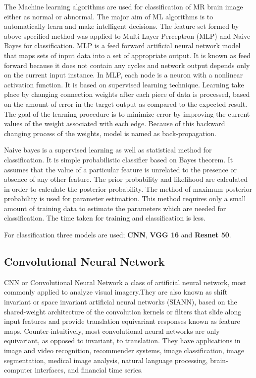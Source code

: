 \documentclass[11pt]{article}
\begin{document}
	The Machine learning algorithms are used for
	classification of MR brain image either as normal or abnormal.  The major
	aim of ML algorithms is to automatically learn and make intelligent
	decisions. The feature set formed by above specified method was applied to
	Multi-Layer Perceptron (MLP) and Naive Bayes for classification.  MLP is
	a feed forward artificial neural network model that maps sets of input data
	into a set of appropriate output. It is known as feed forward because it
	does not contain any cycles and network output depends only on the current
	input instance. In MLP, each node is a neuron with a nonlinear activation
	function. It is based on supervised learning technique. Learning take place
	by changing connection weights after each piece of data is processed, based
	on the amount of error in the target output as compared to the expected
	result. The goal of the learning procedure is to minimize error by improving
	the current values of the weight associated with each edge. Because of this
	backward changing process of the weights, model is named as
	back-propagation.

	Naive bayes is a supervised learning as well as statistical method for
	classification. It is simple probabilistic classifier based on Bayes
	theorem. It assumes that the value of a particular feature is unrelated to
	the presence or absence of any other feature. The prior probability and
	likelihood are calculated in order to calculate the posterior probability.
	The method of maximum posterior probability is used for parameter
	estimation. This method requires only a small amount of training data to
	estimate the parameters which are needed for classification. The time taken
	for training and classification is less.

	For classification three models are used; \textbf{CNN}, \textbf{VGG 16} and
	\textbf{Resnet 50}.

	\subsection{Convolutional Neural Network}%
	\label{sub:Convolutional Neural Network}

	CNN or Convolutional Neural Network a class of artificial neural network,
	most commonly applied to analyze visual imagery.They are also known as
	shift invariant or space invariant artificial neural networks (SIANN), based
	on the shared-weight architecture of the convolution kernels or filters that
	slide along input features and provide translation equivariant responses
	known as feature maps. Counter-intuitively, most convolutional neural
	networks are only equivariant, as opposed to invariant, to translation.
	They have applications in image and video recognition, recommender
	systems, image classification, image segmentation, medical image
	analysis, natural language processing, brain-computer interfaces, and
	financial time series.
\end{document}
